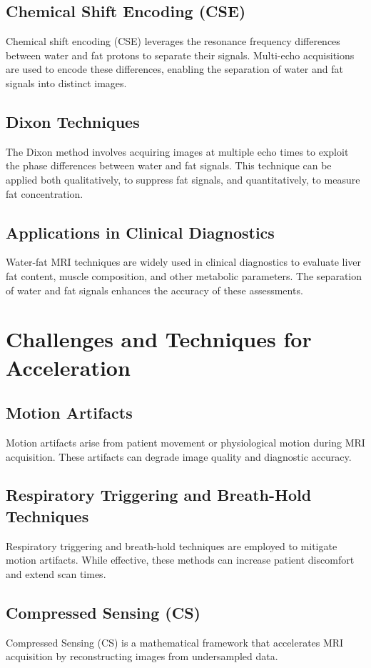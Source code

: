 \section{Chemical Shift Encoding (CSE)}
Chemical shift encoding (CSE) leverages the resonance frequency differences between water and fat protons to separate their signals. Multi-echo acquisitions are used to encode these differences, enabling the separation of water and fat signals into distinct images.

\section{Dixon Techniques}
The Dixon method involves acquiring images at multiple echo times to exploit the phase differences between water and fat signals. This technique can be applied both qualitatively, to suppress fat signals, and quantitatively, to measure fat concentration.

\section{Applications in Clinical Diagnostics}
Water-fat MRI techniques are widely used in clinical diagnostics to evaluate liver fat content, muscle composition, and other metabolic parameters. The separation of water and fat signals enhances the accuracy of these assessments.

\chapter{Challenges and Techniques for Acceleration}

\section{Motion Artifacts}
Motion artifacts arise from patient movement or physiological motion during MRI acquisition. These artifacts can degrade image quality and diagnostic accuracy.

\section{Respiratory Triggering and Breath-Hold Techniques}
Respiratory triggering and breath-hold techniques are employed to mitigate motion artifacts. While effective, these methods can increase patient discomfort and extend scan times.

\section{Compressed Sensing (CS)}
Compressed Sensing (CS) is a mathematical framework that accelerates MRI acquisition by reconstructing images from undersampled data.


